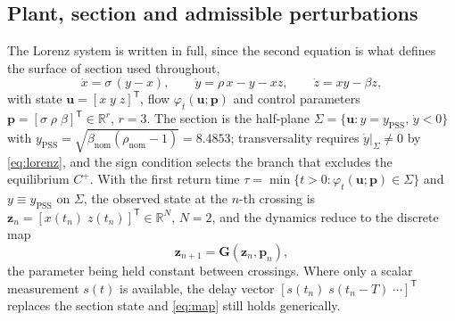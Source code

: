 %
%

\subsection{Plant, section and admissible perturbations}
\label{subsec:ecr-plant}

The Lorenz system is written in full, since the second equation is what defines
the surface of section used throughout,
%
\begin{equation}
\dot{x}=\sigma\,(y-x),
\qquad
\dot{y}=\rho\,x-y-xz,
\qquad
\dot{z}=xy-\beta z,
\label{eq:lorenz}
\end{equation}
%
with state $\mathbf{u}=[x\;y\;z]^{\mathsf T}$, flow
$\varphi_t(\mathbf{u};\mathbf{p})$ and control parameters
$\mathbf{p}=[\sigma\;\rho\;\beta]^{\mathsf T}\in\mathbb{R}^{r}$, $r=3$. The
section is the half-plane
$\Sigma=\{\mathbf{u}:y=y_{\mathrm{PSS}},\,\dot y<0\}$ with
$y_{\mathrm{PSS}}=\sqrt{\beta_{\mathrm{nom}}(\rho_{\mathrm{nom}}-1)}=8.4853$;
transversality requires $\dot y|_{\Sigma}\neq0$ by \eqref{eq:lorenz}, and the
sign condition selects the branch that excludes the equilibrium $C^{+}$. With
the first return time
$\tau=\min\{t>0:\varphi_t(\mathbf{u};\mathbf{p})\in\Sigma\}$ and
$y\equiv y_{\mathrm{PSS}}$ on $\Sigma$, the observed state at the $n$-th
crossing is $\mathbf{z}_n=[x(t_n)\;z(t_n)]^{\mathsf T}\in\mathbb{R}^{N}$,
$N=2$, and the dynamics reduce to the discrete map
%
\begin{equation}
\mathbf{z}_{n+1}=\mathbf{G}(\mathbf{z}_n,\mathbf{p}_n),
\label{eq:map}
\end{equation}
%
the parameter being held constant between crossings. Where only a scalar
measurement $s(t)$ is available,
the delay vector $[s(t_n)\;s(t_n-T)\;\cdots]^{\mathsf T}$ replaces the section
state and \eqref{eq:map} still holds generically.

